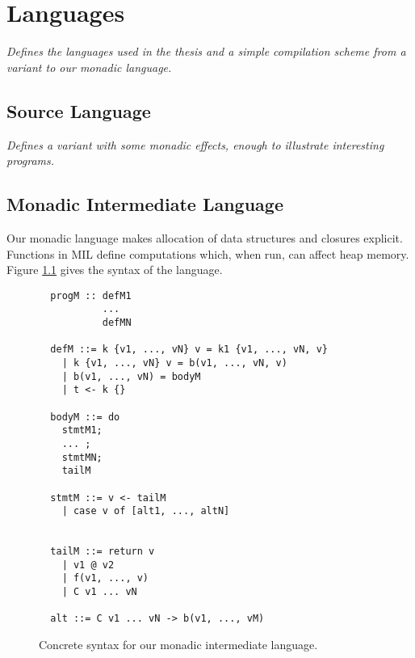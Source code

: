 \documentclass[12pt]{report}
\begin{document}
           {\VerbatimFootnotes
             \DefineShortVerb{\#}
             \doublespacing}{}

\chapter{Languages}
\label{ref_chapter_languages}

\emph{Defines the languages used in the thesis and a simple
  compilation scheme from a \lamA variant to our monadic language. }

\section{Source Language}

\emph{Defines a \lamA variant with some monadic effects, enough to
  illustrate interesting programs.}

\section{Monadic Intermediate Language}


Our monadic language makes allocation
of data structures and closures explicit. Functions in MIL 
define computations which, when run, can affect heap memory. Figure 
\ref{figMILDef} gives the syntax of the language. 


\begin{figure}[h]
\begin{verbatim}
  progM :: defM1
           ...
           defMN

  defM ::= k {v1, ..., vN} v = k1 {v1, ..., vN, v} 
    | k {v1, ..., vN} v = b(v1, ..., vN, v)
    | b(v1, ..., vN) = bodyM
    | t <- k {}

  bodyM ::= do 
    stmtM1; 
    ... ; 
    stmtMN; 
    tailM

  stmtM ::= v <- tailM
    | case v of [alt1, ..., altN]


  tailM ::= return v
    | v1 @ v2
    | f(v1, ..., v)
    | C v1 ... vN

  alt ::= C v1 ... vN -> b(v1, ..., vM)

\end{verbatim}
\caption{Concrete syntax for our monadic intermediate language.}
\label{figMILDef}
\end{figure}
\end{document}
